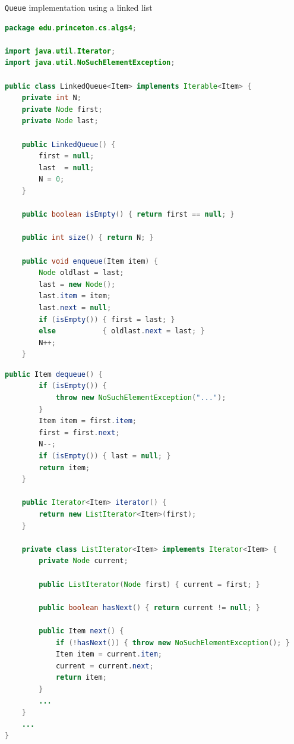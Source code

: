 \documentclass[8pt,a4paper,compress]{beamer}
\begin{document}
\begin{frame}[fragile]
\lstinline{Queue} implementation using a linked list
\begin{lstlisting}[language=Java]
package edu.princeton.cs.algs4;

import java.util.Iterator;
import java.util.NoSuchElementException;

public class LinkedQueue<Item> implements Iterable<Item> {
    private int N; 
    private Node first; 
    private Node last; 

    public LinkedQueue() {
        first = null;
        last  = null;
        N = 0;
    }

    public boolean isEmpty() { return first == null; }

    public int size() { return N; }

    public void enqueue(Item item) {
        Node oldlast = last;
        last = new Node();
        last.item = item;
        last.next = null;
        if (isEmpty()) { first = last; }
        else           { oldlast.next = last; }
        N++;
    }
\end{lstlisting}
\end{frame}

\begin{frame}[fragile]
\begin{lstlisting}[language=Java]
    public Item dequeue() {
        if (isEmpty()) { 
            throw new NoSuchElementException("..."); 
        }
        Item item = first.item;
        first = first.next;
        N--;
        if (isEmpty()) { last = null; }
        return item;
    }

    public Iterator<Item> iterator() { 
        return new ListIterator<Item>(first); 
    }

    private class ListIterator<Item> implements Iterator<Item> {
        private Node current;

        public ListIterator(Node first) { current = first; }

        public boolean hasNext() { return current != null; }

        public Item next() {
            if (!hasNext()) { throw new NoSuchElementException(); }
            Item item = current.item;
            current = current.next; 
            return item;
        }
        ...
    }
    ...
}
\end{lstlisting}
\end{frame}
\end{document}
